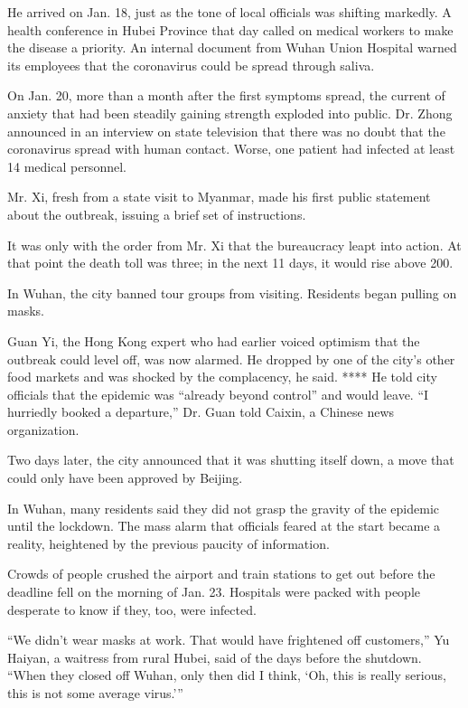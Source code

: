 He arrived on Jan. 18, just as the tone of local officials was shifting
markedly. A health conference in Hubei Province that day called on
medical workers to make the disease a priority. An internal document
from Wuhan Union Hospital warned its employees that the coronavirus
could be spread through saliva.

On Jan. 20, more than a month after the first symptoms spread, the
current of anxiety that had been steadily gaining strength exploded into
public. Dr. Zhong announced in an interview on state television that
there was no doubt that the coronavirus spread with human contact.
Worse, one patient had infected at least 14 medical personnel.

Mr. Xi, fresh from a state visit to Myanmar, made his first public
statement about the outbreak, issuing a brief set of instructions.

It was only with the order from Mr. Xi that the bureaucracy leapt into
action. At that point the death toll was three; in the next 11 days, it
would rise above 200.

In Wuhan, the city banned tour groups from visiting. Residents began
pulling on masks.

Guan Yi, the Hong Kong expert who had earlier voiced optimism that the
outbreak could level off, was now alarmed. He dropped by one of the
city's other food markets and was shocked by the complacency, he said.
**** He told city officials that the epidemic was ``already beyond
control'' and would leave. ``I hurriedly booked a departure,'' Dr. Guan
told Caixin, a Chinese news organization.

Two days later, the city announced that it was shutting itself down, a
move that could only have been approved by Beijing.

In Wuhan, many residents said they did not grasp the gravity of the
epidemic until the lockdown. The mass alarm that officials feared at the
start became a reality, heightened by the previous paucity of
information.

Crowds of people crushed the airport and train stations to get out
before the deadline fell on the morning of Jan. 23. Hospitals were
packed with people desperate to know if they, too, were infected.

``We didn't wear masks at work. That would have frightened off
customers,'' Yu Haiyan, a waitress from rural Hubei, said of the days
before the shutdown. ``When they closed off Wuhan, only then did I
think, `Oh, this is really serious, this is not some average virus.'''

